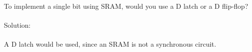 To implement a single bit using SRAM, would you use a D latch or a D flip-flop?\\ \\

Solution: \\ \\
A D latch would be used, since an SRAM is not a synchronous circuit.\\
